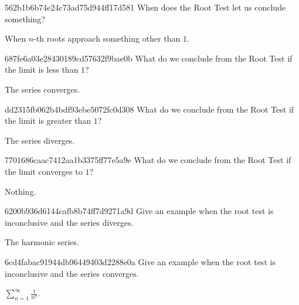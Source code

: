 \begin{note}{562b1b6b74e24c73ad75d944ff17d581}
    When does the Root Test let us conclude something?

    \begin{cloze}{1}
        When \({ n }\)-th roots approach something other than \({ 1 }\).
    \end{cloze}
\end{note}

\begin{note}{687fe6a03e28430189cd57632f9bae0b}
    What do we conclude from the Root Test if the limit is less than \({ 1 }\)?

    \begin{cloze}{1}
        The series converges.
    \end{cloze}
\end{note}

\begin{note}{dd2315fb062b4bdf93ebe5072fc0d308}
    What do we conclude from the Root Test if the limit is greater than \({ 1 }\)?

    \begin{cloze}{1}
        The series diverges.
    \end{cloze}
\end{note}

\begin{note}{7701686caac7412aa1b3375ff77e5a9e}
    What do we conclude from the Root Test if the limit converges to \({ 1 }\)?

    \begin{cloze}{1}
        Nothing.
    \end{cloze}
\end{note}

\begin{note}{6200b936d6144cafb8b74ff7d9271a9d}
    Give an example when the root test is inconclusive and the series diverges.

    \begin{cloze}{1}
        The harmonic series.
    \end{cloze}
\end{note}

\begin{note}{6cd4fabac91944db96449403d2288e0a}
    Give an example when the root test is inconclusive and the series converges.

    \begin{cloze}{1}
        \({ \sum_{n=1}^{\infty} \frac{1}{n^2} }\).
    \end{cloze}
\end{note}

